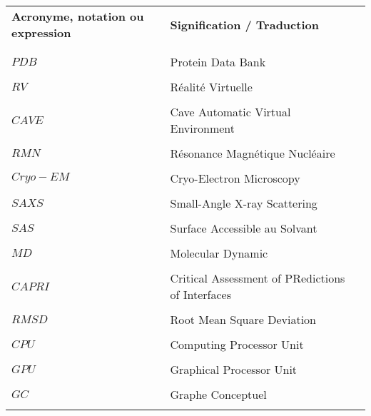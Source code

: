 

\begin{table}[htbp]
\centering
\begin{tabular}{l l l}

\textbf{Acronyme, notation ou expression} & \textbf{Signification / Traduction} & \\ \\ %
\hline
\\
$PDB$ & Protein Data Bank & \\  \\
$RV$ & Réalité Virtuelle & \\  \\
$CAVE$ & Cave Automatic Virtual Environment & \\  \\
$RMN$ & Résonance Magnétique Nucléaire & \\  \\
$Cryo-EM$ & Cryo-Electron Microscopy & \\  \\
$SAXS$ & Small-Angle X-ray Scattering & \\  \\
$SAS$ & Surface Accessible au Solvant & \\  \\
$MD$ & Molecular Dynamic & \\  \\
$CAPRI$ & Critical Assessment of PRedictions of Interfaces & \\  \\
$RMSD$ & Root Mean Square Deviation & \\  \\
$CPU$ & Computing Processor Unit & \\  \\
$GPU$ & Graphical Processor Unit & \\  \\
$GC$ & Graphe Conceptuel & \\  \\

\end{tabular}
\end{table}

